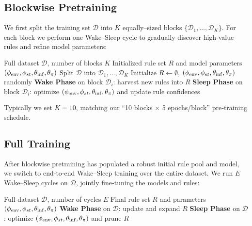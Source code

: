 \documentclass{article} %
\begin{document}
\subsection{Blockwise Pretraining}
We first split the training set $\mathcal D$ into $K$ equally–sized blocks $\{\mathcal D_1,\dots,\mathcal D_K\}$.  For each block we perform one Wake–Sleep cycle to gradually discover high‐value rules and refine model parameters:

\begin{algorithm}[htbp]
\caption{Blockwise Wake–Sleep Pretraining}
\label{alg:blockwise-training}
\begin{algorithmic}[1]
\Require Full dataset $\mathcal D$, number of blocks $K$
\Ensure Initialized rule set $R$ and model parameters $(\phi_{\rm env},\phi_{st},\theta_{\rm inf},\theta_\pi)$
\State Split $\mathcal D$ into $\mathcal D_1,\dots,\mathcal D_K$
\State Initialize $R\leftarrow\emptyset$, $(\phi_{\rm env},\phi_{st},\theta_{\rm inf},\theta_\pi)$ randomly
  \State \textbf{Wake Phase} on block $\mathcal D_i$: harvest new rules into $R$
  \State \textbf{Sleep Phase} on block $\mathcal D_i$: optimize $(\phi_{\rm env},\phi_{st},\theta_{\rm inf},\theta_\pi)$ and update rule confidences
\EndFor
\end{algorithmic}
\end{algorithm}

Typically we set $K=10$, matching our “10 blocks × 5 epochs/block” pre‐training schedule.

\subsection{Full Training}
After blockwise pretraining has populated a robust initial rule pool and model, we switch to end‐to‐end Wake–Sleep training over the entire dataset.  We run $E$ Wake–Sleep cycles on $\mathcal D$, jointly fine‐tuning the models and rules:

\begin{algorithm}[htbp]
\caption{Full Wake–Sleep Training}
\label{alg:full-training}
\begin{algorithmic}[1]
\Require Full dataset $\mathcal D$, number of cycles $E$
\Ensure Final rule set $R$ and parameters $(\phi_{\rm env},\phi_{st},\theta_{\rm inf},\theta_\pi)$
  \State \textbf{Wake Phase} on $\mathcal D$: update and expand $R$
  \State \textbf{Sleep Phase} on $\mathcal D$: optimize $(\phi_{\rm env},\phi_{st},\theta_{\rm inf},\theta_\pi)$ and prune $R$
\EndFor
\end{algorithmic}
\end{algorithm}
\end{document}
